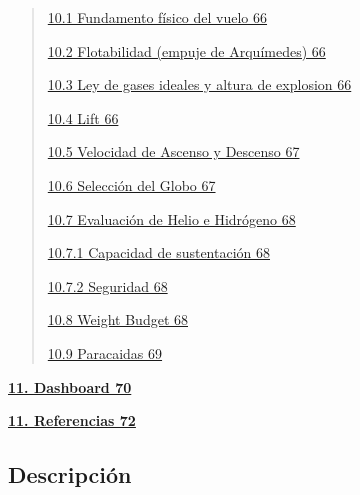 \documentclass[12pt,a4paper]{article}
\begin{document}
\begin{quote}
\hyperref[fundamento-fuxedsico-del-vuelo]{10.1 Fundamento físico del vuelo 66}

\hyperref[flotabilidad-empuje-de-arquuxedmedes]{10.2 Flotabilidad (empuje de Arquímedes) 66}

\hyperref[ley-de-gases-ideales-y-altura-de-explosion]{10.3 Ley de gases ideales y altura de explosion 66}

\hyperref[lift]{10.4 Lift 66}

\hyperref[velocidad-de-ascenso-y-descenso]{10.5 Velocidad de Ascenso y Descenso 67}

\hyperref[selecciuxf3n-del-globo]{10.6 Selección del Globo 67}

\hyperref[evaluaciuxf3n-de-helio-e-hidruxf3geno]{10.7 Evaluación de Helio e Hidrógeno 68}

\hyperref[capacidad-de-sustentaciuxf3n]{10.7.1 Capacidad de sustentación 68}

\hyperref[seguridad]{10.7.2 Seguridad 68}

\hyperref[weight-budget]{10.8 Weight Budget 68}

\hyperref[paracaidas]{10.9 Paracaidas 69}
\end{quote}

\hyperref[dashboard]{\textbf{11. Dashboard 70}}

\hyperref[referencias]{\textbf{11. Referencias 72}}

\subsection{}\label{section}

\subsection{}\label{section-1}

\subsection{}\label{section-2}

\subsection{}\label{section-3}

\subsection{Descripción}\label{descripciuxf3n}
\end{document}
